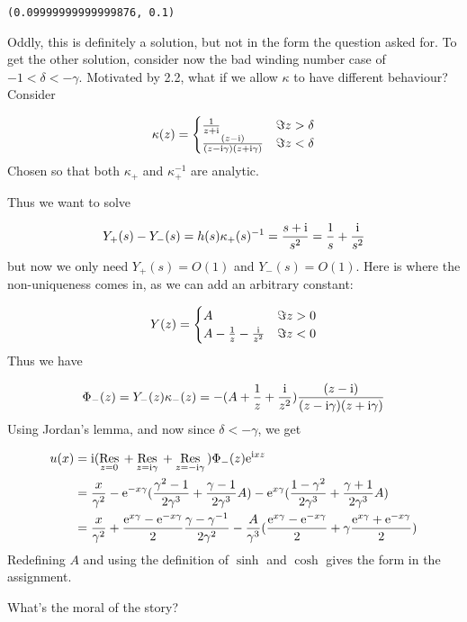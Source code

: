 \documentclass[12pt,a4paper]{article}
\def\I{ {\rm i} }
\def\E{ {\rm e} }
\def\Res_#1{\underset{#1}{\rm Res}\,}
\begin{document}
\begin{lstlisting}
(0.09999999999999876, 0.1)
\end{lstlisting}


Oddly, this is definitely a solution, but not in the form the question asked for. To get the other solution, consider now the bad winding number case of $-1 < \delta < - \gamma$. Motivated by 2.2, what if we allow $\kappa$ to have different behaviour? Consider

\[
\kappa(z) = \begin{cases}
    {1 \over z + \I} & \Im z > \delta\\
    {(z-\I)  \over (z-\I  \gamma) (z+\I  \gamma)} & \Im z < \delta
    \end{cases}
\]
Chosen so that both $\kappa_+$ and $\kappa_+^{-1}$ are analytic.

Thus we want to solve

\[
Y_+(s) - Y_-(s) = h(s) \kappa_+(s)^{-1} =  { s + \I \over s^2} = {1 \over s} + {\I \over s^2}
\]
but now we only need $Y_+(s) = O(1)$ and $Y_-(s) = O(1)$. Here is where the non-uniqueness comes in, as we can add an arbitrary constant:

\[
Y(z) = \begin{cases}
                      A            & \Im z > 0 \\
   A -   {1 \over z} - {\I \over z^2} & \Im z < 0
\end{cases}
\]
Thus we have

\[
\Phi_-(z) = Y_-(z) \kappa_-(z) = -(  A +    {1 \over z} +  {\I \over z^2} ){(z-\I)  \over (z-\I  \gamma) (z+\I  \gamma)}
\]
Using Jordan's lemma, and now since $\delta < - \gamma$, we get


\begin{align*}
u(x) &= \I (\Res_{z = 0} + \Res_{z = \I \gamma} + \Res_{z = - \I \gamma})  \Phi_-(z) \E^{\I x z} \\
&= {x \over \gamma^2} - \E^{-x \gamma}( {\gamma^2-1 \over 2 \gamma^3} + {\gamma-1 \over 2\gamma^3}   A) - \E^{x \gamma} ({1-\gamma^2 \over 2 \gamma^3} + {\gamma+1 \over 2\gamma^3}   A)\\
&=  {x \over \gamma^2} + {\E^{x \gamma} - \E^{-x \gamma} \over 2} {\gamma-\gamma^{-1} \over 2 \gamma^2}  - {A \over \gamma^3} ( {\E^{x \gamma} - \E^{-x \gamma} \over 2} +  \gamma {\E^{x \gamma} + \E^{-x \gamma} \over 2} )
\end{align*}
Redefining $A$ and using the definition of $\sinh$ and $\cosh$ gives the form in the assignment.

What's the moral of the story?
\end{document}
